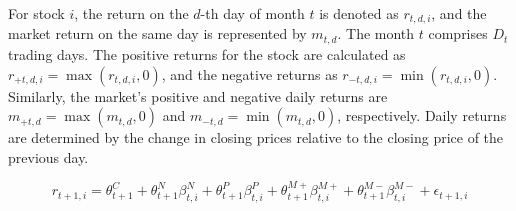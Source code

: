 \documentclass{article}
\begin{document}
For stock \(i\), the return on the \(d\)-th day of month \(t\) is denoted as \(r_{t,d,i}\), and the market return on the same day is represented by \(m_{t,d}\). The month \(t\) comprises \(D_t\) trading days. The positive returns for the stock are calculated as \(r_{+t,d,i} = \max(r_{t,d,i}, 0)\), and the negative returns as \(r_{-t,d,i} = \min(r_{t,d,i}, 0)\). Similarly, the market’s positive and negative daily returns are \(m_{+t,d} = \max(m_{t,d}, 0)\) and \(m_{-t,d} = \min(m_{t,d}, 0)\), respectively. Daily returns are determined by the change in closing prices relative to the closing price of the previous day.



\begin{equation}
r_{t+1,i} = \theta^C_{t+1} + \theta^N_{t+1} \beta^N_{t,i} + \theta^P_{t+1} \beta^P_{t,i} + \theta^{M+}_{t+1} \beta^{M+}_{t,i} + \theta^{M-}_{t+1} \beta^{M-}_{t,i} + \epsilon_{t+1,i}
\end{equation}
\end{document}
